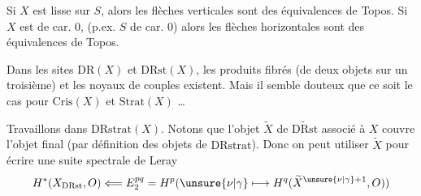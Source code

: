 

Si $X$ est  lisse sur $S$, alors les flèches verticales sont des équivalences de Topos. Si $X$ est de car. 0, (p.ex. $S$ de car. 0) alors les flèches horizontales sont des équivalences de Topos.

Dans les sites $\mathrm{DR}(X)$ et $\mathrm{DRst}(X)$, les produits fibrés (de deux objets sur un troisième) et les noyaux de couples existent. Mais il semble douteux que ce soit le cas pour  $\mathrm{Cris}(X)$ et $\mathrm{Strat}(X)$ \ldots
{}


Travaillons dans $\mathrm{DRstrat}(X)$. Notons que l'objet $\widetilde X$ de $\widetilde{\mathrm{DRst}}$ associé à $X$ couvre l'objet final (par définition des objets de $\mathrm{DRstrat}$). Donc on peut utiliser  $\widetilde X$ pour écrire une suite spectrale de Leray
\[
H^*(X_{\mathrm{DRst}},O)\Longleftarrow E_2^{pq}=H^p(\unsure{\nu|\gamma}\longmapsto H^q(\widetilde X^{\unsure{\nu|\gamma}+1},O))
\]
